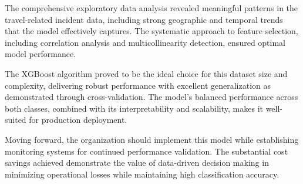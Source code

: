 \documentclass[12pt,a4paper]{report}
\begin{document}
The comprehensive exploratory data analysis revealed meaningful patterns in the travel-related incident data, including strong geographic and temporal trends that the model effectively captures. The systematic approach to feature selection, including correlation analysis and multicollinearity detection, ensured optimal model performance.

The XGBoost algorithm proved to be the ideal choice for this dataset size and complexity, delivering robust performance with excellent generalization as demonstrated through cross-validation. The model's balanced performance across both classes, combined with its interpretability and scalability, makes it well-suited for production deployment.

Moving forward, the organization should implement this model while establishing monitoring systems for continued performance validation. The substantial cost savings achieved demonstrate the value of data-driven decision making in minimizing operational losses while maintaining high classification accuracy.
\end{document}
